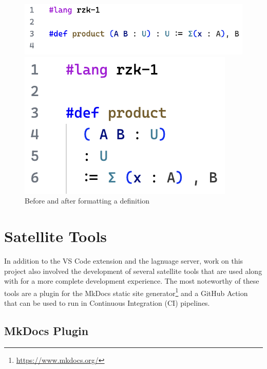 \begin{figure}
  \centering
  \begin{minipage}{0.55\textwidth}
    \centering
    \includegraphics[width=\textwidth]{figs/formatting-before.png}
  \end{minipage}\hfill
  \begin{minipage}{0.35\textwidth}
    \centering
    \includegraphics[width=\textwidth]{figs/formatting-after.png}
  \end{minipage}
  \caption{Before and after formatting a definition}
  \label{figure:formatting}
\end{figure}

\section{Satellite Tools}

In addition to the VS Code extension and the lagnuage server, work on this project also
involved the development of several satellite tools that are used along with \Rzk{}
for a more complete development experience.
The most noteworthy of these tools are a plugin for the MkDocs static site generator\footnote{
  \url{https://www.mkdocs.org/}}
and a GitHub Action that can be used to run \Rzk{} in Continuous Integration (CI) pipelines.

\subsection{MkDocs Plugin}

